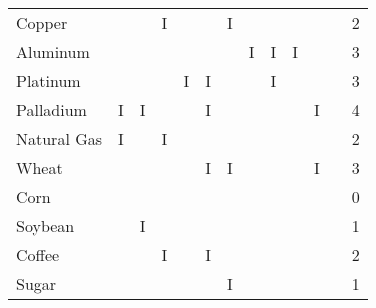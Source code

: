 \documentclass[12pt,a4paper,english]{article}
\begin{document}
\begin{table}[H]
\begin{minipage}{\textwidth}
{\begin{tabular}{@{}lrrrrrrrrrrr|r@{}}
				Copper                                         &                                   &                               & I                               &                                    &   & I &   &   &   &   &   & 2 \\
				Aluminum                                       &                                   &                               &                                 &                                    &   &   & I & I & I &   &   & 3 \\
				Platinum                                       &                                   &                               &                                 & I                                  & I &   &   & I &   &   &   & 3 \\
				Palladium                                      & I                                 & I                             &                                 &                                    & I &   &   &   &   & I &   & 4 \\
				Natural Gas                                    & I                                 &                               & I                               &                                    &   &   &   &   &   &   &   & 2 \\
				Wheat                                          &                                   &                               &                                 &                                    & I & I &   &   &   & I &   & 3 \\
				Corn                                           &                                   &                               &                                 &                                    &   &   &   &   &   &   &   & 0 \\
				Soybean                                        &                                   & I                             &                                 &                                    &   &   &   &   &   &   &   & 1 \\
				Coffee                                         &                                   &                               & I                               &                                    & I &   &   &   &   &   &   & 2 \\
				Sugar                                          &                                   &                               &                                 &                                    &   & I &   &   &   &   &   & 1 \\

\end{tabular}}
\end{minipage}
\end{table}
\end{document}
